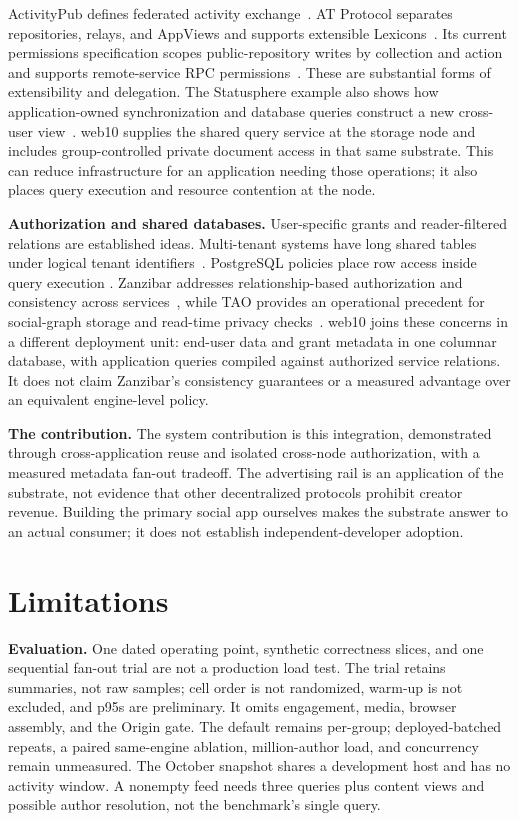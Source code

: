 \documentclass[sigconf, nonacm]{acmart}
\begin{document}
ActivityPub defines federated activity exchange~\cite{activitypub2018}.
AT Protocol separates repositories, relays, and AppViews and supports
extensible Lexicons~\cite{kleppmann2024}. Its current permissions
specification scopes public-repository writes by collection and action
and supports remote-service RPC permissions~\cite{at-permissions}.
These are substantial forms of extensibility and delegation. The
Statusphere example also shows how application-owned synchronization
and database queries construct a new cross-user view~\cite{at-statusphere}.
web10 supplies the shared query service at the storage node and includes
group-controlled private document access in that same substrate. This
can reduce infrastructure for an application needing those operations;
it also places query execution and resource contention at the node.

\textbf{Authorization and shared databases.}
User-specific grants and reader-filtered relations are established
ideas. Multi-tenant systems have long shared tables under logical
tenant identifiers~\cite{force2009,aulbach2008,jacobs2007}.
PostgreSQL policies place row access inside query execution
\cite{postgres-rls}. Zanzibar addresses relationship-based authorization
and consistency across services~\cite{zanzibar2019}, while TAO provides
an operational precedent for social-graph storage and read-time privacy
checks~\cite{tao2013}. web10 joins these concerns in a different
deployment unit: end-user data and grant metadata in one columnar
database, with application queries compiled against authorized service
relations. It does not claim Zanzibar's consistency guarantees or a
measured advantage over an equivalent engine-level policy.

\textbf{The contribution.} The system contribution is this integration,
demonstrated through cross-application reuse and isolated cross-node
authorization, with a measured metadata fan-out tradeoff. The advertising
rail is an application of the substrate, not evidence that other
decentralized protocols prohibit creator revenue. Building the primary
social app ourselves makes the substrate answer to an actual consumer;
it does not establish independent-developer adoption.

\section{Limitations}
\label{sec:limitations}

\textbf{Evaluation.} One dated operating point, synthetic correctness
slices, and one sequential fan-out trial are not a production load test.
The trial retains summaries, not raw samples; cell order is not randomized,
warm-up is not excluded, and p95s are preliminary. It omits engagement,
media, browser assembly, and the Origin gate. The default remains per-group;
deployed-batched repeats, a paired same-engine ablation, million-author
load, and concurrency remain unmeasured. The October snapshot shares a
development host and has no activity window. A nonempty feed needs three
queries plus content views and possible author resolution, not the
benchmark's single query.
\end{document}

